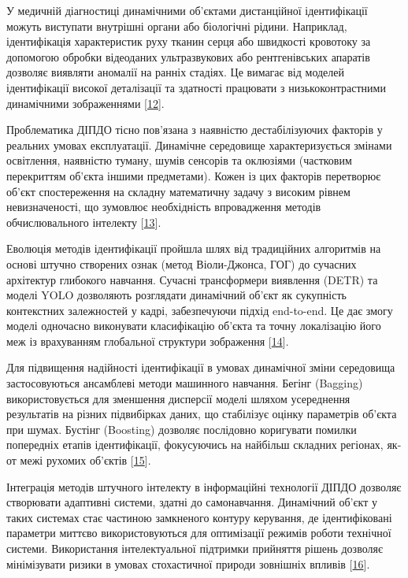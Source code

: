 \documentclass[
]{article}
\begin{document}
У медичній діагностиці динамічними об'єктами дистанційної ідентифікації можуть виступати внутрішні органи або біологічні рідини. Наприклад, ідентифікація характеристик руху тканин серця або швидкості кровотоку за допомогою обробки відеоданих ультразвукових або рентгенівських апаратів дозволяє виявляти аномалії на ранніх стадіях. Це вимагає від моделей ідентифікації високої деталізації та здатності працювати з низькоконтрастними динамічними зображеннями {[}\hyperref[_Ref221444338]{12}{]}.

Проблематика ДІПДО тісно пов'язана з наявністю дестабілізуючих факторів у реальних умовах експлуатації. Динамічне середовище характеризується змінами освітлення, наявністю туману, шумів сенсорів та оклюзіями (частковим перекриттям об'єкта іншими предметами). Кожен із цих факторів перетворює об'єкт спостереження на складну математичну задачу з високим рівнем невизначеності, що зумовлює необхідність впровадження методів обчислювального інтелекту {[}\hyperref[_Ref221549463]{13}{]}.

Еволюція методів ідентифікації пройшла шлях від традиційних алгоритмів на основі штучно створених ознак (метод Віоли-Джонса, ГОГ) до сучасних архітектур глибокого навчання. Сучасні трансформери виявлення (DETR) та моделі YOLO дозволяють розглядати динамічний об'єкт як сукупність контекстних залежностей у кадрі, забезпечуючи підхід end-to-end. Це дає змогу моделі одночасно виконувати класифікацію об'єкта та точну локалізацію його меж із врахуванням глобальної структури зображення {[}\hyperref[_Ref221549586]{14}{]}.

Для підвищення надійності ідентифікації в умовах динамічної зміни середовища застосовуються ансамблеві методи машинного навчання. Бегінг (Bagging) використовується для зменшення дисперсії моделі шляхом усереднення результатів на різних підвибірках даних, що стабілізує оцінку параметрів об'єкта при шумах. Бустінг (Boosting) дозволяє послідовно коригувати помилки попередніх етапів ідентифікації, фокусуючись на найбільш складних регіонах, як-от межі рухомих об'єктів {[}\hyperref[_Ref221549767]{15}{]}.

Інтеграція методів штучного інтелекту в інформаційні технології ДІПДО дозволяє створювати адаптивні системи, здатні до самонавчання. Динамічний об'єкт у таких системах стає частиною замкненого контуру керування, де ідентифіковані параметри миттєво використовуються для оптимізації режимів роботи технічної системи. Використання інтелектуальної підтримки прийняття рішень дозволяє мінімізувати ризики в умовах стохастичної природи зовнішніх впливів {[}\hyperref[_Ref221549991]{16}{]}.
\end{document}
